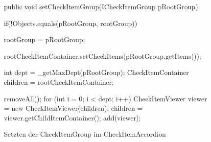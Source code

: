 \begin{wrapfigure}[15]{r}[0px]{322px}
    \centering
	\vspace{-12px}
	\begin{spacing}{0.75}
		\begin{javacode}[firstnumber=62]
public void setCheckItemGroup(ICheckItemGroup pRootGroup)
{
  if(!Objects.equals(pRootGroup, rootGroup))
  {
    rootGroup = pRootGroup;
    
    rootCheckItemContainer.setCheckItems(pRootGroup.getItems());
    
    int dept = _getMaxDept(pRootGroup);
    CheckItemContainer children = rootCheckItemContainer;
    
    removeAll();
    for (int i = 0; i < dept; i++)
    {
      CheckItemViewer viewer = new CheckItemViewer(children);
      children = viewer.getChildItemContainer();
      add(viewer);
    }
  }
}\end{javacode}
	\end{spacing}
	\caption{Setzten der CheckItemGroup im CheckItemAccordion}
	\label{fig:CheckItemAccordion-setCheckItemGroup}
\end{wrapfigure}